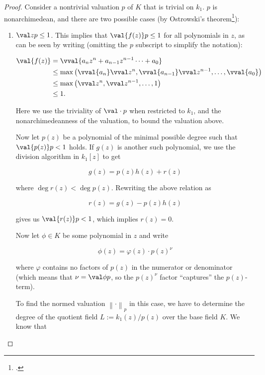 \begin{proof}
  Consider a nontrivial valuation $p$ of $K$ that is trivial on $k_1$. $p$ is
  nonarchimedean, and there are two possible cases (by Ostrowski's
  theorem\footcite{kcnrdostrowskift}):

  \begin{enumerate}
  \item $\val z p \leq 1$. This implies that $\val {f(z)} p \leq 1$ for all
    polynomials in $z$, as can be seen by writing (omitting the $p$ subscript to
    simplify the notation):

    \begin{align*}
      \val {f(z)} &=    \vval {a_nz^n + a_{n-1}z^{n-1} \cdots + a_0} \\
                  &\leq \max{\left( \vval {a_n} \vval z ^n, \vval {a_{n-1}}\vval z^{n-1}, \ldots, \vval {a_0} \right)} \\
                  &\leq \max{\left( \vval z ^n, \vval z^{n-1}, \ldots, 1 \right)} \\
                  &\leq 1.
    \end{align*}

    Here we use the triviality of $\val \cdot p$ when restricted to $k_1$, and
    the nonarchimedeanness of the valuation, to bound the valuation above.

    Now let $p(z)$ be a polynomial of the minimal possible
    degree such that $\val {p(z)} p < 1$ holds. If $g(z)$ is another such
    polynomial, we use the division algorithm in $k_1[z]$ to get

    \[ g(z) = p(z)h(z) + r(z) \]

    where $\deg r(z) < \deg p(z)$. Rewriting the above relation as

    \[ r(z) = g(z) - p(z)h(z) \]

    gives us $\val {r(z)} p < 1$, which implies $r(z) = 0$.

    Now let $\phi \in K$ be some polynomial in $z$ and write

    \[ \phi(z) = \varphi(z) \cdot p(z)^\nu \]

    where $\varphi$ contains no factors of $p(z)$ in the numerator or denominator
    (which means that $\nu = \val \phi p$, so the $p(z)^\nu$ factor ``captures''
    the $p(z)$-term).

    To find the normed valuation ${ \left\lVert \cdot \right\rVert }_p$ in this case,
    we have to determine the degree of the quotient field $L := k_1(z)/p(z)$ over
    the base field $K$. We know that


\end{enumerate}
\end{proof}

